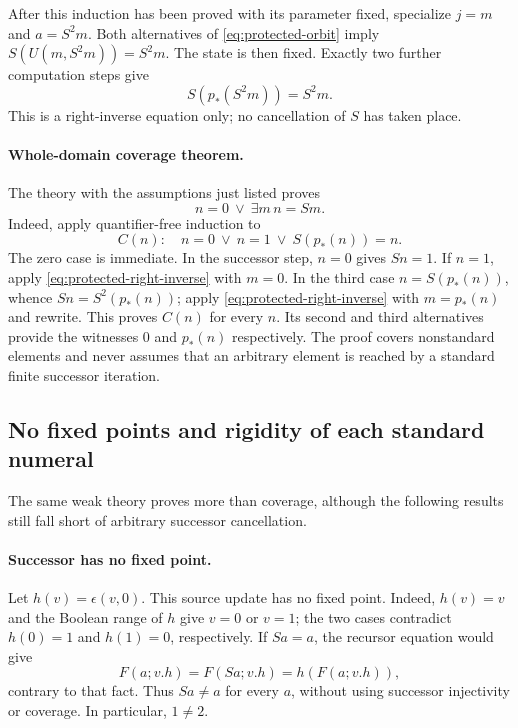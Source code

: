 After this induction has been proved with its parameter fixed,
specialize $j=m$ and $a=S^2m$. Both alternatives of
\eqref{eq:protected-orbit} imply $S(U(m,S^2m))=S^2m$. The state is
then fixed. Exactly two further computation steps give
\begin{equation}
                     S(p_*(S^2m))=S^2m.
 \label{eq:protected-right-inverse}
\end{equation}
This is a right-inverse equation only; no cancellation of $S$ has
taken place.

\paragraph{Whole-domain coverage theorem.}
The theory with the assumptions just listed proves
\[
                     n=0\ \lor\ \exists m\,n=Sm.
\]
Indeed, apply quantifier-free induction to
\[
 C(n):\quad n=0\ \lor\ n=1\ \lor\ S(p_*(n))=n.
\]
The zero case is immediate. In the successor step, $n=0$ gives
$Sn=1$. If $n=1$, apply \eqref{eq:protected-right-inverse} with
$m=0$. In the third case $n=S(p_*(n))$, whence
$Sn=S^2(p_*(n))$; apply \eqref{eq:protected-right-inverse} with
$m=p_*(n)$ and rewrite. This proves $C(n)$ for every $n$.
Its second and third alternatives provide the witnesses $0$ and
$p_*(n)$ respectively. The proof covers nonstandard elements and
never assumes that an arbitrary element is reached by a standard
finite successor iteration.

\subsection{No fixed points and rigidity of each standard numeral}

The same weak theory proves more than coverage, although the following
results still fall short of arbitrary successor cancellation.

\paragraph{Successor has no fixed point.}
Let $h(v)=\epsilon(v,0)$. This source update has no fixed point.
Indeed, $h(v)=v$ and the Boolean range of $h$ give $v=0$ or $v=1$;
the two cases contradict $h(0)=1$ and $h(1)=0$, respectively.
If $Sa=a$, the recursor equation would give
\[
 F(a;v.h)=F(Sa;v.h)=h(F(a;v.h)),
\]
contrary to that fact. Thus $Sa\ne a$ for every $a$, without using
successor injectivity or coverage. In particular, $1\ne2$.

